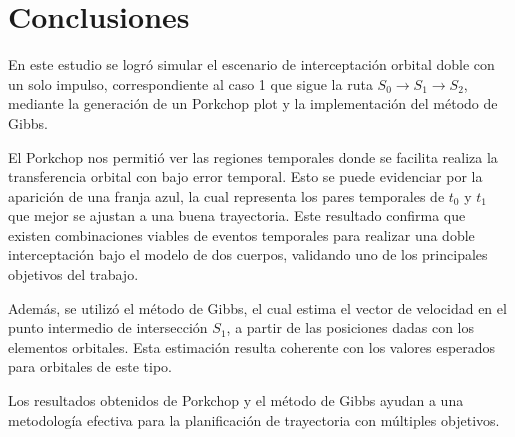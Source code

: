 \section{Conclusiones}

En este estudio se logró simular el escenario de interceptación orbital doble
con un solo impulso, correspondiente al caso 1 que sigue la ruta $S_0
    \rightarrow S_1 \rightarrow S_2$, mediante la generación de un Porkchop plot y
la implementación del método de Gibbs.

El Porkchop nos permitió ver las regiones temporales donde se facilita realiza
la transferencia orbital con bajo error temporal. Esto se puede evidenciar por
la aparición de una franja azul, la cual representa los pares temporales de
$t_0$ y $t_1$ que mejor se ajustan a una buena trayectoria. Este resultado
confirma que existen combinaciones viables de eventos temporales para realizar
una doble interceptación bajo el modelo de dos cuerpos, validando uno de los
principales objetivos del trabajo.

Además, se utilizó el método de Gibbs, el cual estima el vector de velocidad en
el punto intermedio de intersección $S_1$, a partir de las posiciones dadas con
los elementos orbitales. Esta estimación resulta coherente con los valores
esperados para orbitales de este tipo.

Los resultados obtenidos de Porkchop y el método de Gibbs ayudan a una
metodología efectiva para la planificación de trayectoria con múltiples
objetivos.